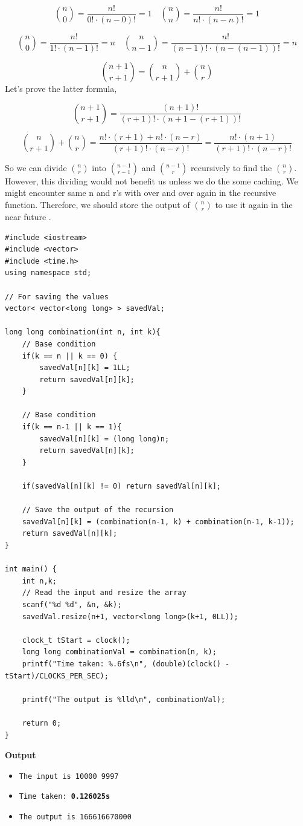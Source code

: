 \documentclass[12pt]{article}
\begin{document}
\[\binom n0 = \frac{n!}{0! \cdot (n-0)!} = 1 \quad \binom nn = \frac{n!}{n! \cdot (n-n)!} = 1\]

\[\binom n0 = \frac{n!}{1! \cdot (n-1)!} = n \quad \binom n{n-1} = \frac{n!}{(n-1)! \cdot (n-(n-1))!} = n\]

\[\binom {n+1}{r+1} = \binom {n}{r+1} + \binom {n}{r}\]
Let's prove the latter formula,

\[ \binom {n+1}{r+1} = \frac{(n+1)!}{(r+1)! \cdot (n+1-(r+1))!}\]

\[  \binom {n}{r+1} + \binom {n}{r} = \frac{n!\cdot(r+1) + n!\cdot(n-r)}{(r+1)! \cdot (n-r)!} = \frac{n!\cdot(n+1)}{(r+1)! \cdot (n-r)!}\]

So we can divide  $\binom{n}{r}$ into $\binom{n-1}{r-1}$ and $\binom{n-1}{r}$ recursively to find the $\binom{n}{r}$. However, this dividing would not benefit us unless we do the some caching. We might encounter same n and r's with over and over again in the recursive function. Therefore, we should store the output of $\binom{n}{r}$ to use it again in the near future \cite{combinationfind}.
\clearpage

\begin{verbatim}
#include <iostream>
#include <vector>
#include <time.h>
using namespace std;

// For saving the values
vector< vector<long long> > savedVal;

long long combination(int n, int k){
    // Base condition
    if(k == n || k == 0) {
        savedVal[n][k] = 1LL;
        return savedVal[n][k];
    }
    
    // Base condition
    if(k == n-1 || k == 1){
        savedVal[n][k] = (long long)n;
        return savedVal[n][k];
    }
    
    if(savedVal[n][k] != 0) return savedVal[n][k];
    
    // Save the output of the recursion
    savedVal[n][k] = (combination(n-1, k) + combination(n-1, k-1));
    return savedVal[n][k];
}

int main() {
    int n,k;
    // Read the input and resize the array
    scanf("%d %d", &n, &k);
    savedVal.resize(n+1, vector<long long>(k+1, 0LL));
    
    clock_t tStart = clock();
    long long combinationVal = combination(n, k);
    printf("Time taken: %.6fs\n", (double)(clock() - tStart)/CLOCKS_PER_SEC);
    
    printf("The output is %lld\n", combinationVal);
    
    return 0;
}

\end{verbatim}
\textbf{Output}
\begin{itemize}
  \item \texttt{The input is 10000 9997} 
  \item \texttt{Time taken: \textbf{0.126025s}} 
  \item \texttt{The output is 166616670000}
\end{itemize}
\end{document}
